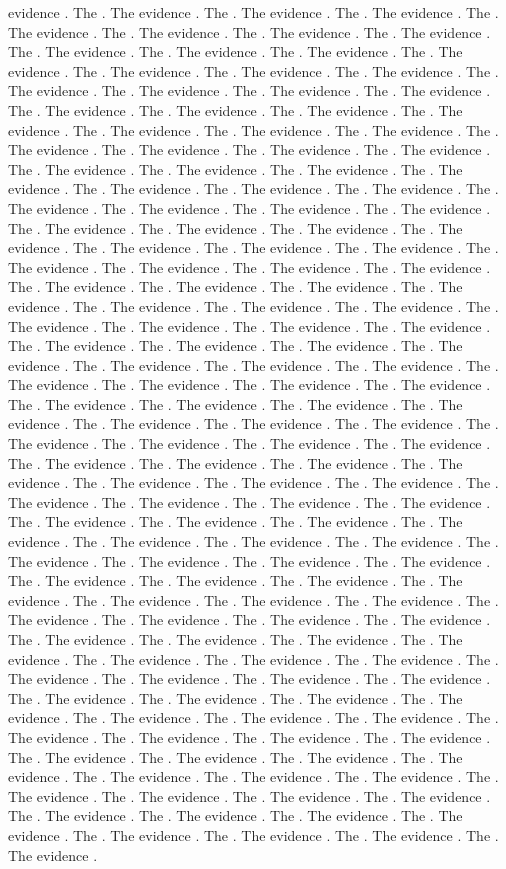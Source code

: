{{{{evidence . The . The evidence . The . The evidence . The . The evidence . The . The evidence . The . The evidence . The . The evidence . The . The evidence . The . The evidence . The . The evidence . The . The evidence . The . The evidence . The . The evidence . The . The evidence . The . The evidence . The . The evidence . The . The evidence . The . The evidence . The . The evidence . The . The evidence . The . The evidence . The . The evidence . The . The evidence . The . The evidence . The . The evidence . The . The evidence . The . The evidence . The . The evidence . The . The evidence . The . The evidence . The . The evidence . The . The evidence . The . The evidence . The . The evidence . The . The evidence . The . The evidence . The . The evidence . The . The evidence . The . The evidence . The . The evidence . The . The evidence . The . The evidence . The . The evidence . The . The evidence . The . The evidence . The . The evidence . The . The evidence . The . The evidence . The . The evidence . The . The evidence . The . The evidence . The . The evidence . The . The evidence . The . The evidence . The . The evidence . The . The evidence . The . The evidence . The . The evidence . The . The evidence . The . The evidence . The . The evidence . The . The evidence . The . The evidence . The . The evidence . The . The evidence . The . The evidence . The . The evidence . The . The evidence . The . The evidence . The . The evidence . The . The evidence . The . The evidence . The . The evidence . The . The evidence . The . The evidence . The . The evidence . The . The evidence . The . The evidence . The . The evidence . The . The evidence . The . The evidence . The . The evidence . The . The evidence . The . The evidence . The . The evidence . The . The evidence . The . The evidence . The . The evidence . The . The evidence . The . The evidence . The . The evidence . The . The evidence . The . The evidence . The . The evidence . The . The evidence . The . The evidence . The . The evidence . The . The evidence . The . The evidence . The . The evidence . The . The evidence . The . The evidence . The . The evidence . The . The evidence . The . The evidence . The . The evidence . The . The evidence . The . The evidence . The . The evidence . The . The evidence . The . The evidence . The . The evidence . The . The evidence . The . The evidence . The . The evidence . The . The evidence . The . The evidence . The . The evidence . The . The evidence . The . The evidence . The . The evidence . The . The evidence . The . The evidence . The . The evidence . The . The evidence . The . The evidence . The . The evidence . The . The evidence . The . The evidence . The . The evidence . The . The evidence . The . The evidence . The . The evidence . The . The evidence . The . The evidence . The . The evidence . The . The evidence . The . The evidence . The . The evidence . The . The evidence . The . The evidence . The . The evidence . The . The evidence . The . The evidence . The . The evidence . The . The evidence . The . The evidence . The . The evidence . The . The evidence . The . The evidence . The . The evidence . The . The evidence . The . The evidence . The . The evidence . The . The evidence . The . The evidence . The . The evidence . The . The evidence . The . The evidence . }}}}
